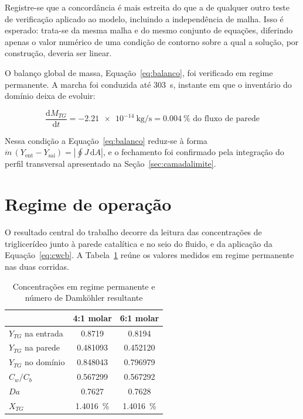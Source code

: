 Registre-se que a concordância é mais estreita do que a de qualquer outro teste
de verificação aplicado ao modelo, incluindo a independência de malha. Isso é
esperado: trata-se da mesma malha e do mesmo conjunto de equações, diferindo
apenas o valor numérico de uma condição de contorno sobre a qual a solução, por
construção, deveria ser linear.

O balanço global de massa, Equação~\eqref{eq:balanco}, foi verificado em regime
permanente. A marcha foi conduzida até \SI{303}{\second}, instante em que o
inventário do domínio deixa de evoluir:

\begin{equation}
\frac{\mathrm{d}M_{TG}}{\mathrm{d}t} = \SI{-2.21e-14}{\kilogram\per\second}
= \SI{0.004}{\percent} \text{ do fluxo de parede}
\end{equation}

Nessa condição a Equação~\eqref{eq:balanco} reduz-se à forma
$\dot{m}\,(Y_{\text{ent}} - Y_{\text{sai}}) = |\oint J\,\mathrm{d}A|$, e o
fechamento foi confirmado pela integração do perfil transversal apresentado na
Seção~\ref{sec:camadalimite}.

\section{Regime de operação}

O resultado central do trabalho decorre da leitura das concentrações de
triglicerídeo junto à parede catalítica e no seio do fluido, e da aplicação da
Equação~\eqref{eq:cwcb}. A Tabela~\ref{tab:daresultado} reúne os valores
medidos em regime permanente nas duas corridas.

\begin{table}[htb]
\centering
\caption{Concentrações em regime permanente e número de Damköhler resultante}
\label{tab:daresultado}
\begin{tabular}{l c c}
\toprule
 & \num{4}:\num{1} molar & \num{6}:\num{1} molar \\
\midrule
$Y_{TG}$ na entrada             & \num{0.8719}   & \num{0.8194}   \\
$Y_{TG}$ na parede              & \num{0.481093} & \num{0.452120} \\
$Y_{TG}$ no domínio             & \num{0.848043} & \num{0.796979} \\
\midrule
$C_w/C_b$                       & \num{0.567299} & \num{0.567292} \\
$Da$                            & \num{0.7627}   & \num{0.7628}   \\
$X_{TG}$                        & \SI{1.4016}{\percent} & \SI{1.4016}{\percent} \\
\bottomrule
\end{tabular}
\end{table}

